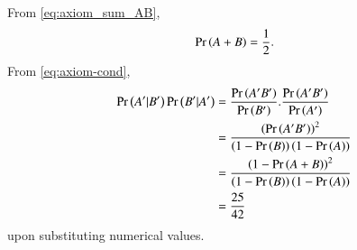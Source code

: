 From \eqref{eq:axiom_sum_AB},
\begin{align}
\Pr\left(A+B\right) = \frac{1}{2}.
\end{align}
From \eqref{eq:axiom-cond},
\begin{align}
 \Pr\left(A^{\prime}|B^{\prime}\right)\Pr\left(B^{\prime}|A^{\prime}\right)  &= \frac{\Pr\left(A^{\prime}B^{\prime}\right)}{\Pr\left(B^{\prime}\right)}.\frac{\Pr\left(A^{\prime}B^{\prime}\right)}{\Pr\left(A^{\prime}\right)}\\
 &= \frac{\left(\Pr\left(A^{\prime}B^{\prime}\right)\right)^{2}}{\left(1 -\Pr\left(B\right)\right)\left(1 -\Pr\left(A\right)\right)}\\
 &= \frac{\left(1 - \Pr\left(A+B\right)\right)^{2}}{\left(1 -\Pr\left(B\right)\right)\left(1 -\Pr\left(A\right)\right)}\\
 &= \frac{25}{42} 
\end{align}
upon substituting numerical values.

